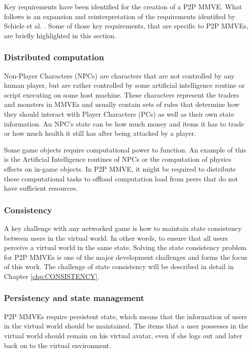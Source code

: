Key requirements have been identified for the creation of a P2P MMVE. What follows is an expansion and reinterpretation of the requirements identified by Schiele et al. \cite{Schiele_p2p_requirements}. Some of those key requirements, that are specific to P2P MMVEs, are briefly highlighted in this section.

\subsubsection{Distributed computation}
\label{distributed_computation_requirement}

Non-Player Characters (NPCs) are characters that are not controlled by any human player, but are rather controlled by some artificial intelligence routine or script executing on some host machine. These characters represent the traders and monsters in MMVEs and usually contain sets of rules that determine how they should interact with Player Characters (PCs) as well as their own state information. An NPC's state can be how much money and items it has to trade or how much health it still has after being attacked by a player.

Some game objects require computational power to function. An example of this is the Artificial Intelligence routines of NPCs or the computation of physics effects on in-game objects. In P2P MMVE, it might be required to distribute these computational tasks to offload computation load from peers that do not have sufficient resources.

\subsubsection{Consistency}
A key challenge with any networked game is how to maintain state consistency between users in the virtual world. In other words, to ensure that all users perceive a virtual world in the same state. Solving the state consistency problem for P2P MMVEs is one of the major development challenges and forms the focus of this work. The challenge of state consistency will be described in detail in Chapter \ref{chp:CONSISTENCY}.

\subsubsection{Persistency and state management}

P2P MMVEs require persistent state, which means that the information of users in the virtual world should be maintained. The items that a user possesses in the virtual world should remain on his virtual avatar, even if she logs out and later back on to the virtual environment.

